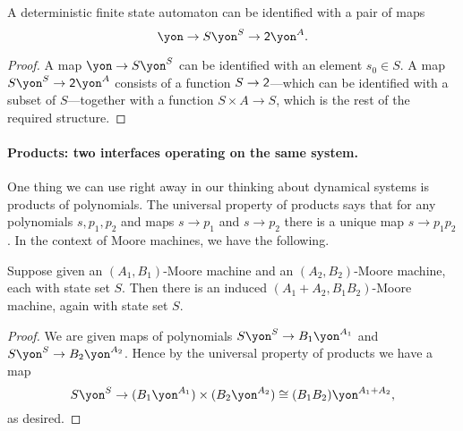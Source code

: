 \documentclass[Book-Poly]{subfiles}
\begin{document}
\begin{proposition}
A deterministic finite state automaton can be identified with a pair of maps
\[
\yon\to S\yon^S\to \2\yon^A.
\]
\end{proposition}
\begin{proof}
A map $\yon\to S\yon^S$ can be identified with an element $s_0\in S$. A map $S\yon^S\to\2\yon^A$ consists of a function $S\to\textsf{2}$---which can be identified with a subset of $S$---together with a function $S\times A\to S$, which is the rest of the required structure.
\end{proof}


\paragraph{Products: two interfaces operating on the same system.}

One thing we can use right away in our thinking about dynamical systems is products of polynomials. The universal property of products says that for any polynomials $s,p_1,p_2$ and maps $s\to p_1$ and $s\to p_2$ there is a unique map $s\to p_1p_2$. In the context of Moore machines, we have the following.

\begin{proposition}
Suppose given an $(A_1,B_1)$-Moore machine and an $(A_2,B_2)$-Moore machine, each with state set $S$. Then there is an induced $(A_1+A_2,B_1B_2)$-Moore machine, again with state set $S$.
\end{proposition}
\begin{proof}
We are given maps of polynomials $S\yon^S\to B_1\yon^{A_1}$ and $S\yon^S\to B_2\yon^{A_2}$. Hence by the universal property of products we have a map
\[
  S\yon^S\to
  (B_1\yon^{A_1})\times(B_2\yon^{A_2})
  \cong(B_1B_2)\yon^{A_1+A_2},
\] 
as desired.
\end{proof}
\end{document}
